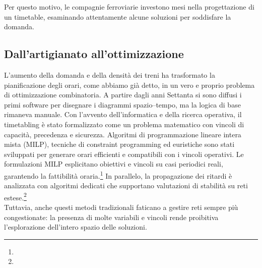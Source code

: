 \documentclass{report}
\newcommand{\fnShort}[2][]{\footnote{\footshorthand[#1]{#2}}}
\begin{document}
Per questo motivo, le compagnie ferroviarie investono mesi nella progettazione di un timetable, esaminando attentamente alcune soluzioni per soddisfare la domanda.



\subsection{Dall’artigianato all’ottimizzazione}
L’aumento della domanda e della densità dei treni ha trasformato la pianificazione degli orari, come abbiamo già detto, in un vero e proprio problema di ottimizzazione combinatoria. A partire dagli anni Settanta si sono diffusi i primi software per disegnare i diagrammi spazio–tempo, ma la logica di base rimaneva manuale. Con l’avvento dell’informatica e della ricerca operativa, il timetabling è stato formalizzato come un problema matematico con vincoli di capacità, precedenza e sicurezza. Algoritmi di programmazione lineare intera mista (MILP), tecniche di constraint programming ed euristiche sono stati sviluppati per generare orari efficienti e compatibili con i vincoli operativi.
Le formulazioni MILP esplicitano obiettivi e vincoli su casi periodici reali, garantendo la fattibilità oraria.\fnShort{Caprara2002}
In parallelo, la propagazione dei ritardi è analizzata con algoritmi dedicati che supportano valutazioni di stabilità su reti estese.\fnShort{TRC2010}
\\ Tuttavia, anche questi metodi tradizionali faticano a gestire reti sempre più congestionate: la presenza di molte variabili e vincoli rende proibitiva l’esplorazione dell’intero spazio delle soluzioni.
\end{document}
